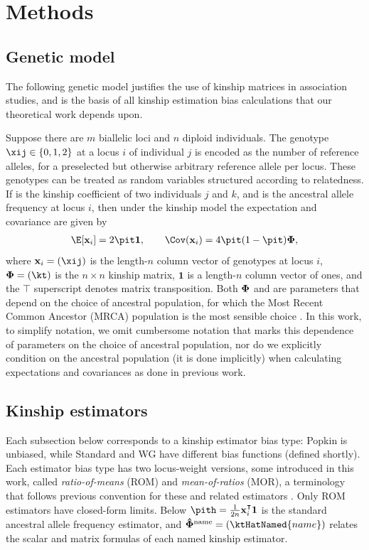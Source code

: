 \documentclass[11pt]{article}
\newcommand{\kinMat}{%
  \ensuremath{%
    \mathbf{\Phi}
  }%
  \xspace%
}%
\newcommand{\kinMatEstNamed}[1]{%
  \ensuremath{%
    \mathbf{\hat{\Phi}}^\text{#1}
  }%
  \xspace%
}%
\begin{document}
\section{Methods}

\subsection{Genetic model}

The following genetic model justifies the use of kinship matrices in association studies, and is the basis of all kinship estimation bias calculations that our theoretical work depends upon.

Suppose there are $m$ biallelic loci and $n$ diploid individuals.
The genotype $\xij \in \{0,1,2\}$ at a locus $i$ of individual $j$ is encoded as the number of reference alleles, for a preselected but otherwise arbitrary reference allele per locus.
These genotypes can be treated as random variables structured according to relatedness.
If \kt is the kinship coefficient of two individuals $j$ and $k$, and \pit is the ancestral allele frequency at locus $i$, then under the kinship model \citep{ochoa_estimating_2021} the expectation and covariance are given by
\begin{align*}
  \E[ \mathbf{x}_i ]
  =
    2 \pit \mathbf{1}
  ,
  \quad\quad
  \Cov(\mathbf{x}_i)
  =
    4 \pit (1-\pit) \kinMat
    ,
\end{align*}
where $\mathbf{x}_i = (\xij)$ is the length-$n$ column vector of genotypes at locus $i$, $\kinMat = (\kt)$ is the $n \times n$ kinship matrix, $\mathbf{1}$ is a length-$n$ column vector of ones, and the $\intercal$ superscript denotes matrix transposition.
Both $\kinMat$ and \pit are parameters that depend on the choice of ancestral population, for which the Most Recent Common Ancestor (MRCA) population is the most sensible choice \citep{ochoa_estimating_2021}.
In this work, to simplify notation, we omit cumbersome notation that marks this dependence of parameters on the choice of ancestral population, nor do we explicitly condition on the ancestral population (it is done implicitly) when calculating expectations and covariances as done in previous work.

\subsection{Kinship estimators}

Each subsection below corresponds to a kinship estimator bias type: Popkin is unbiased, while Standard and WG have different bias functions (defined shortly).
Each estimator bias type has two locus-weight versions, some introduced in this work, called \textit{ratio-of-means} (ROM) and \textit{mean-of-ratios} (MOR), a terminology that follows previous convention for these and related estimators \citep{bhatia_estimating_2013, ochoa_estimating_2021}.
Only ROM estimators have closed-form limits.
Below
$
\pith
=
\frac{1}{2n} \mathbf{x}_i^\intercal \mathbf{1}
$
is the standard ancestral allele frequency estimator,
and
$\kinMatEstNamed{name} = (\ktHatNamed{name})$
relates the scalar and matrix formulas of each named kinship estimator.
\end{document}
